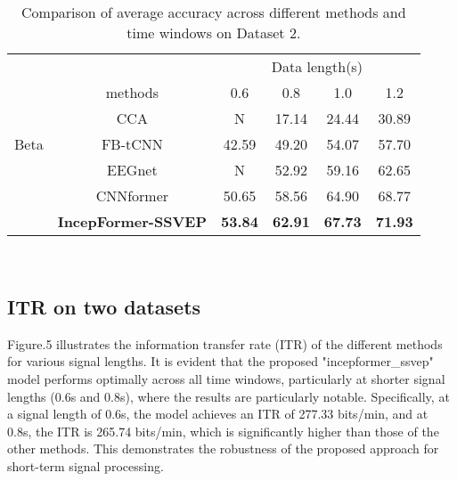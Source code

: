 \documentclass[10pt]{iopart}
\begin{document}
\begin{table*}[htbp]
\begin{center}
\caption{Comparison of average accuracy across different methods and time windows on Dataset 2.}
\begin{tabular}{c|c|cccc}
\hline
          &                            & \multicolumn{4}{c}{Data length(s)}                                \\ \cline{3-6} 
          & methods                    & 0.6            & 0.8            & 1.0            & 1.2            \\ \hline
          & CCA                        & N              & 17.14          & 24.44          & 30.89          \\
Beta      & FB-tCNN                    & 42.59          & 49.20          & 54.07          & 57.70          \\
          & EEGnet                     & N              & 52.92          & 59.16          & 62.65          \\
          & CNNformer                  & 50.65          & 58.56          & 64.90          & 68.77          \\
\textbf{} & \textbf{IncepFormer-SSVEP} & \textbf{53.84} & \textbf{62.91} & \textbf{67.73} & \textbf{71.93} \\ \hline
\end{tabular}
\end{center}
\end{table*}

‌\subsection{ITR on two datasets}
Figure.5 illustrates the information transfer rate (ITR) of the different methods for various signal lengths. It is evident that the proposed "incepformer\_ssvep" model performs optimally across all time windows, particularly at shorter signal lengths (0.6s and 0.8s), where the results are particularly notable. Specifically, at a signal length of 0.6s, the model achieves an ITR of 277.33 bits/min, and at 0.8s, the ITR is 265.74 bits/min, which is significantly higher than those of the other methods. This demonstrates the robustness of the proposed approach for short-term signal processing.
\end{document}
